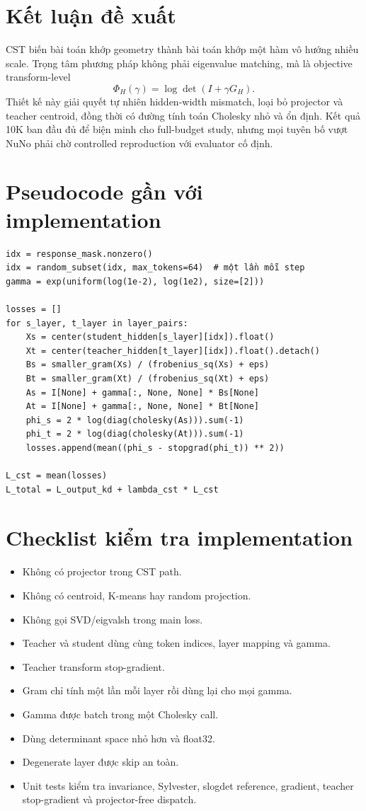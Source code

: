 \documentclass{article}
\newcommand{\cst}{\textsc{CST}}
\begin{document}
\section{Kết luận đề xuất}

\cst{} biến bài toán khớp geometry thành bài toán khớp một hàm vô hướng nhiều
scale.  Trọng tâm phương pháp không phải eigenvalue matching, mà là objective
transform-level
\begin{equation*}
 \Phi_H(\gamma)=\log\det(I+\gamma G_H).
\end{equation*}
Thiết kế này giải quyết tự nhiên hidden-width mismatch, loại bỏ projector và
teacher centroid, đồng thời có đường tính toán Cholesky nhỏ và ổn định.  Kết quả
10K ban đầu đủ để biện minh cho full-budget study, nhưng mọi tuyên bố vượt NuNo
phải chờ controlled reproduction với evaluator cố định.

\appendix
\section{Pseudocode gần với implementation}
\begin{verbatim}
idx = response_mask.nonzero()
idx = random_subset(idx, max_tokens=64)  # một lần mỗi step
gamma = exp(uniform(log(1e-2), log(1e2), size=[2]))

losses = []
for s_layer, t_layer in layer_pairs:
    Xs = center(student_hidden[s_layer][idx]).float()
    Xt = center(teacher_hidden[t_layer][idx]).float().detach()
    Bs = smaller_gram(Xs) / (frobenius_sq(Xs) + eps)
    Bt = smaller_gram(Xt) / (frobenius_sq(Xt) + eps)
    As = I[None] + gamma[:, None, None] * Bs[None]
    At = I[None] + gamma[:, None, None] * Bt[None]
    phi_s = 2 * log(diag(cholesky(As))).sum(-1)
    phi_t = 2 * log(diag(cholesky(At))).sum(-1)
    losses.append(mean((phi_s - stopgrad(phi_t)) ** 2))

L_cst = mean(losses)
L_total = L_output_kd + lambda_cst * L_cst
\end{verbatim}

\section{Checklist kiểm tra implementation}
\begin{itemize}
 \item Không có projector trong CST path.
 \item Không có centroid, K-means hay random projection.
 \item Không gọi SVD/eigvalsh trong main loss.
 \item Teacher và student dùng cùng token indices, layer mapping và gamma.
 \item Teacher transform stop-gradient.
 \item Gram chỉ tính một lần mỗi layer rồi dùng lại cho mọi gamma.
 \item Gamma được batch trong một Cholesky call.
 \item Dùng determinant space nhỏ hơn và float32.
 \item Degenerate layer được skip an toàn.
 \item Unit tests kiểm tra invariance, Sylvester, slogdet reference, gradient,
 teacher stop-gradient và projector-free dispatch.
\end{itemize}
\end{document}

